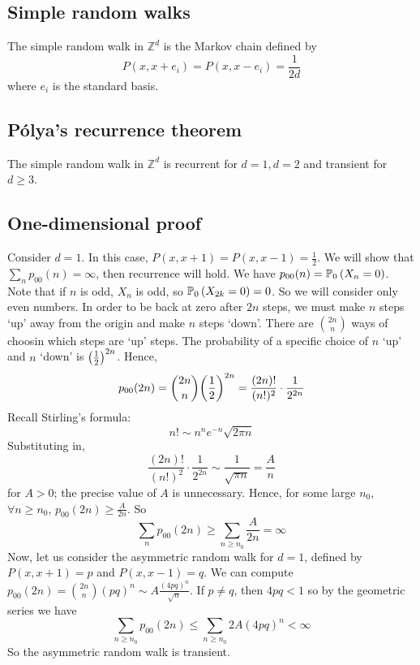 \subsection{Simple random walks}
\begin{definition}
	The simple random walk in \( \mathbb Z^d \) is the Markov chain defined by
	\[
		P(x,x+e_i) = P(x,x-e_i) = \frac{1}{2d}
	\]
	where \( e_i \) is the standard basis.
\end{definition}

\subsection{P\'olya's recurrence theorem}
\begin{theorem}
	The simple random walk in \( \mathbb Z^d \) is recurrent for \( d = 1, d = 2 \) and transient for \( d \geq 3 \).
\end{theorem}

\subsection{One-dimensional proof}
Consider \( d = 1 \).
In this case, \( P(x,x+1) = P(x,x-1) = \frac{1}{2} \).
We will show that \( \sum_n p_{00}(n) = \infty \), then recurrence will hold.
We have \( p_{00}(n) = \mathbb{P}_{0}\left({X_n = 0}\right) \).
Note that if \( n \) is odd, \( X_n \) is odd, so \( \mathbb{P}_{0}\left({X_{2k} = 0}\right) = 0 \).
So we will consider only even numbers.
In order to be back at zero after \( 2n \) steps, we must make \( n \) steps `up' away from the origin and make \( n \) steps `down'.
There are \( \binom{2n}{n} \) ways of choosin which steps are `up' steps.
The probability of a specific choice of \( n \) `up' and \( n \) `down' is \( \qty(\frac{1}{2})^{2n} \).
Hence,
\[
	p_{00}(2n) = \binom{2n}{n} \qty(\frac{1}{2})^{2n} = \frac{(2n)!}{(n!)^2} \cdot \frac{1}{2^{2n}}
\]
Recall Stirling's formula:
\[
	n!
	\sim n^n e^{-n} \sqrt{2 \pi n}
\]
Substituting in,
\[
	\frac{(2n)!}{(n!)^2} \cdot \frac{1}{2^{2n}} \sim \frac{1}{\sqrt{\pi n}} = \frac{A}{n}
\]
for \( A > 0 \); the precise value of \( A \) is unnecessary.
Hence, for some large \( n_0 \), \( \forall n \geq n_0 \), \( p_{00}(2n) \geq \frac{A}{2n} \).
So
\[
	\sum_n p_{00}(2n) \geq \sum_{n \geq n_0} \frac{A}{2n} = \infty
\]
Now, let us consider the asymmetric random walk for \( d = 1 \), defined by \( P(x,x+1) = p \) and \( P(x,x-1) = q \).
We can compute \( p_{00}(2n) = \binom{2n}{n} (pq)^n \sim A \frac{(4pq)^n}{\sqrt{n}} \).
If \( p \neq q \), then \( 4pq < 1 \) so by the geometric series we have
\[
	\sum_{n \geq n_0} p_{00}(2n) \leq \sum_{n \geq n_0} 2A (4pq)^n < \infty
\]
So the asymmetric random walk is transient.

